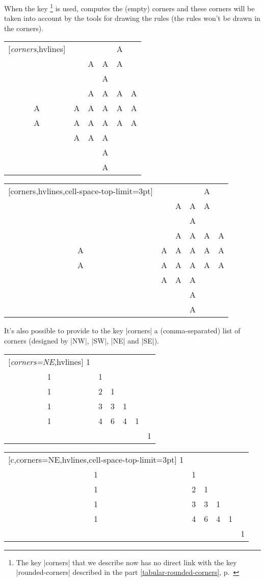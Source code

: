 \documentclass[dvipsnames]{article}%
\begin{document}
\bigskip
When the key \footnote{The key |corners| that we describe now
has no direct link with the key |rounded-corners| described in the part
\ref{tabular-rounded-corners}, p.~\pageref{tabular-rounded-corners}} is used,
 computes the (empty) corners and these corners will be taken
into account by the tools for drawing the rules (the rules won't be drawn in
the corners).

\bigskip
\begin{Code}[width=11cm]
\begin{NiceTabular}{*{6}{c}}[\emph{corners},hvlines]
  &   &   &   & A \\
  &   & A & A & A \\
  &   &   & A \\
  &   & A & A & A & A \\
A & A & A & A & A & A \\
A & A & A & A & A & A \\
  & A & A & A \\
  &  & & A \\
  &   &   & A \\
\end{NiceTabular}
\end{Code}
\begin{NiceTabular}{*{6}{c}}[corners,hvlines,cell-space-top-limit=3pt]
  &   &   &   & A \\
  &   & A & A & A \\
  &   &   & A \\
  &   & A & A & A & A \\
A & A & A & A & A & A \\
A & A & A & A & A & A \\
  & A & A & A \\
  &  & & A \\
  &   &   & A \\
\end{NiceTabular}


\bigskip
It's also possible to provide to the key |corners| a (comma-separated) list of
corners (designed by |NW|, |SW|, |NE| and |SE|).

\medskip
\begin{Code}[width=11cm]
\begin{NiceTabular}{*{6}{c}}[\emph{corners=NE},hvlines]
1\\
1&1\\
1&2&1\\
1&3&3&1\\
1&4&6&4&1\\
 & & & & &1
\end{NiceTabular}
\end{Code}
\begin{NiceTabular}{*{6}{c}}[c,corners=NE,hvlines,cell-space-top-limit=3pt]
1\\
1&1\\
1&2&1\\
1&3&3&1\\
1&4&6&4&1\\
 & & & & &1
\end{NiceTabular}
\end{document}
